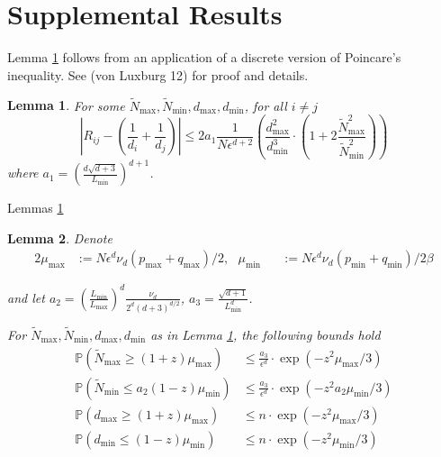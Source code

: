 \documentclass{article}
\newcommand{\Prob}[1]{\mathbb{P}\left( #1 \right)}
\newcommand{\abs}[1]{\left \lvert #1 \right \rvert}
\theoremstyle{alden}
\newtheorem{lemma}{Lemma}
\theoremstyle{definition}
\theoremstyle{remark}
\begin{document}
\section{Supplemental Results}

Lemma \ref{lem: vonluxburg_poincare} follows from an application of a discrete version of Poincare's inequality. See (von Luxburg 12) for proof and details.
\begin{lemma}
	\label{lem: vonluxburg_poincare}
	For some $\widetilde{N}_{\max}, \widetilde{N}_{\min}, d_{\max}, d_{\min}$, for all $i \neq j$
	\begin{equation*}
	\abs{R_{ij} - \left(\frac{1}{d_i} + \frac{1}{d_j} \right)} \leq 2 a_1 \frac{1}{N \epsilon^{d+2}} \left( \frac{d_{\max}^2}{d_{\min}^3} \cdot(1 + 2 \frac{\widetilde{N}_{\max}^2}{\widetilde{N}_{\min}^2}) \right)
	\end{equation*}
	where $a_1 = \left( \frac{d \sqrt{d + 3}}{L_{\min}} \right)^{d + 1}$. 
\end{lemma}

Lemmas \ref{}

\begin{lemma}
Denote
\begin{alignat*}{2}
\mu_{\max} & := N \epsilon^d \nu_{d} (p_{\max} + q_{\max})/2,  ~~~ \mu_{\min} && := N \epsilon^d \nu_{d} (p_{\min} + q_{\min})/2 \beta
\end{alignat*}

and let $a_2 = \left(\frac{L_{\min}}{L_{\max}}\right)^d \frac{\nu_d}{2^d (d + 3)^{d/2}}$, $a_3 = \frac{\sqrt{d + 1}}{L_{\min}^d}$. 

For $\widetilde{N}_{\max}, \widetilde{N}_{\min}, d_{\max}, d_{\min}$ as in Lemma \ref{lem: vonluxburg_poincare}, the following bounds hold
\begin{align*}
\Prob{\widetilde{N}_{\max} \geq (1 + z) \mu_{\max}} & \leq \frac{a_3}{\epsilon^d} \cdot \exp(- z^2 \mu_{\max} / 3) \\
\Prob{\widetilde{N}_{\min} \leq a_2 (1 - z) \mu_{\min}} & \leq \frac{a_3}{\epsilon^d} \cdot \exp(- z^2 a_2 \mu_{\min} / 3) \\
\Prob{d_{\max} \geq (1 + z) \mu_{\max}} & \leq n \cdot \exp(- z^2 \mu_{\max} / 3) \\
\Prob{d_{\min} \leq (1 - z) \mu_{\min}} & \leq n \cdot \exp(- z^2 \mu_{\min} / 3)
\end{align*}
\end{lemma}
\end{document}
